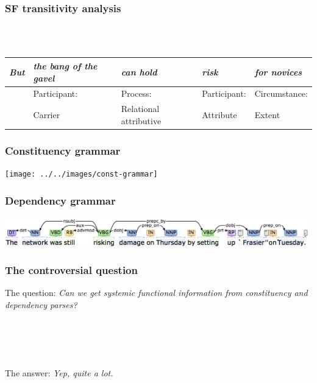 \documentclass{beamer}       %
\begin{document}
\begin{frame}\frametitle{SF transitivity analysis}

~\\
~\\
\small
\begin{tabularx}{0.99\textwidth}{|l|l|X|X|X|}
\hline
\emph{But}     & \emph{the bang of the gavel}             & \emph{can hold}          & \emph{risk} & \emph{for novices}          \\ \hline
~ & Participant: & Process: & Participant: & Circumstance:  \\
~ & Carrier & Relational \mbox{attributive} & Attribute &  Extent \\ \hline
\end{tabularx}
\end{frame}

\begin{frame}
    \frametitle{Constituency grammar}
    \centering
    \texttt{[image: ../../images/const-grammar]}
\end{frame}

\begin{frame}
    \frametitle{Dependency grammar}
    \centering
    \includegraphics[width=0.99\textwidth]{../../images/depparse}
\end{frame}

\begin{frame}\frametitle{The controversial question}

The question: \emph{Can we get systemic functional information from constituency and dependency parses?}

~\\~\\~\\~\\

The answer: \emph{Yep, quite a lot.}
\end{frame}
\end{document}
